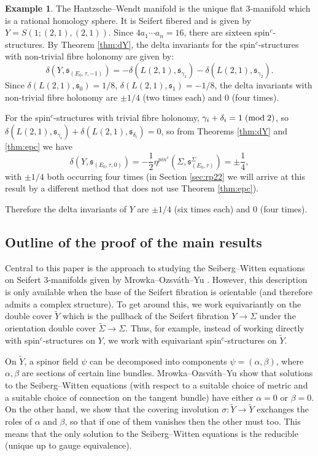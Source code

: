 \documentclass{amsart}
\theoremstyle{definition}
\newtheorem{example}[theorem]{Example}
\theoremstyle{remark}
\numberwithin{equation}{section}
\begin{document}
\begin{example}
The Hantzsche--Wendt manifold is the unique flat $3$-manifold which is a rational homology sphere. It is Seifert fibered and is given by $Y = S( 1 ; (2,1) , (2,1) )$. Since $4a_1 \cdots a_n = 16$, there are sixteen spin$^c$-structures. By Theorem \ref{thm:dY}, the delta invariants for the spin$^c$-structures with non-trivial fibre holonomy are given by:
\[
\delta(Y , \mathfrak{s}_{(E_0 , \tau , -1)} ) = -\delta( L(2,1) , \mathfrak{s}_{\gamma_1}) - \delta( L(2,1) , \mathfrak{s}_{\gamma_2}).
\]
Since $\delta( L(2,1) , \mathfrak{s}_0 ) = 1/8$, $\delta( L(2,1) , \mathfrak{s}_1) = -1/8$, the delta invariants with non-trivial fibre holonomy are $\pm 1/4$ (two times each) and $0$ (four times).

For the spin$^c$-structures with trivial fibre holonomy, $\gamma_i + \delta_i = 1 \; ({\rm mod} \; 2)$, so $\delta( L(2,1) , \mathfrak{s}_{\gamma_i}) + \delta( L(2,1) , \mathfrak{s}_{\delta_i}) = 0$, so from Theorems \ref{thm:dY} and \ref{thm:epc} we have
\[
\delta(Y , \mathfrak{s}_{(E_0 , \tau , 0)}) =  - \frac{1}{2} \eta^{pin^c}(\Sigma , \mathfrak{s}_{(E_0 , \tau)}^{\Sigma}) = \pm \frac{1}{4},
\]
with $\pm 1/4$ both occurring four times (in Section \ref{sec:rp22} we will arrive at this result by a different method that does not use Theorem \ref{thm:epc}).

Therefore the delta invariants of $Y$ are $\pm 1/4$ (six times each) and $0$ (four times).
\end{example}

\subsection{Outline of the proof of the main results}

Central to this paper is the approach to studying the Seiberg--Witten equations on Seifert $3$-manifolds given by Mrowka--Ozsv\'ath--Yu \cite{moy}. However, this description is only available when the base of the Seifert fibration is orientable (and therefore admits a complex structure). To get around this, we work equivariantly on the double cover $\widetilde{Y}$ which is the pullback of the Seifert fibration $Y \to \Sigma$ under the orientation double cover $\widetilde{\Sigma} \to \Sigma$. Thus, for example, instead of working directly with spin$^c$-structures on $Y$, we work with equivariant spin$^c$-structures on $\widetilde{Y}$.

On $\widetilde{Y}$, a spinor field $\psi$ can be decomposed into components $\psi = (\alpha , \beta)$, where $\alpha, \beta$ are sections of certain line bundles. Mrowka--Ozsv\'ath--Yu show that solutions to the Seiberg--Witten equations (with respect to a suitable choice of metric and a suitable choice of connection on the tangent bundle) have either $\alpha = 0$ or $\beta = 0$. On the other hand, we show that the covering involution $\sigma \colon \widetilde{Y} \to \widetilde{Y}$ exchanges the roles of $\alpha$ and $\beta$, so that if one of them vanishes then the other must too. This means that the only solution to the Seiberg--Witten equations is the reducible (unique up to gauge equivalence). 
\end{document}
